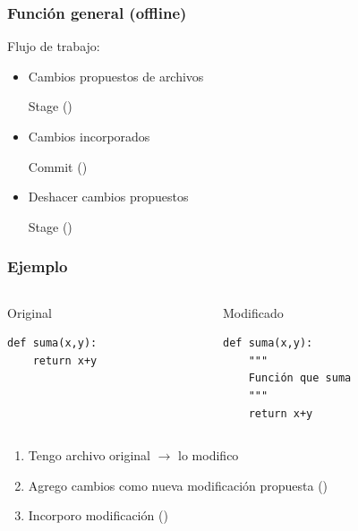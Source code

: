 \documentclass[14pt,aspectratio=169,xcolor=dvipsnames]{beamer}
\begin{document}
\begin{frame}\frametitle{Función general (offline)}
    Flujo de trabajo:
    \begin{itemize}
        \item Cambios propuestos de archivos \phantom{ }
            
            \begin{minipage}{0.35\textwidth}
            \begin{block}{}
                Stage \hfill()
            \end{block}
            \end{minipage}

        \item Cambios incorporados \phantom{ }

            \begin{minipage}{0.35\textwidth}
            \begin{block}{}
                Commit \hfill()
            \end{block}
            \end{minipage}

        \item Deshacer cambios propuestos \phantom{ }
            
            \begin{minipage}{0.35\textwidth}
            \begin{block}{}
                Stage \hfill()
            \end{block}
            \end{minipage}

    \end{itemize}
\end{frame}
\begin{frame}[t,fragile]\frametitle{Ejemplo}
  \begin{columns}
    \begin{column}[t]{0.45\textwidth}
        Original
        \begin{verbatim}
def suma(x,y):
    return x+y
        \end{verbatim}
    \end{column}
    \begin{column}[t]{0.45\textwidth}
        Modificado
        \begin{verbatim}
def suma(x,y):
    """
    Función que suma
    """
    return x+y
        \end{verbatim}
    \end{column}
  \end{columns}
    
\begin{enumerate}
    \item Tengo archivo original $\to$ lo modifico
    \item Agrego cambios como nueva modificación propuesta \hfill ()
    \item Incorporo modificación \hfill ()
\end{enumerate}
\end{frame}
\end{document}
